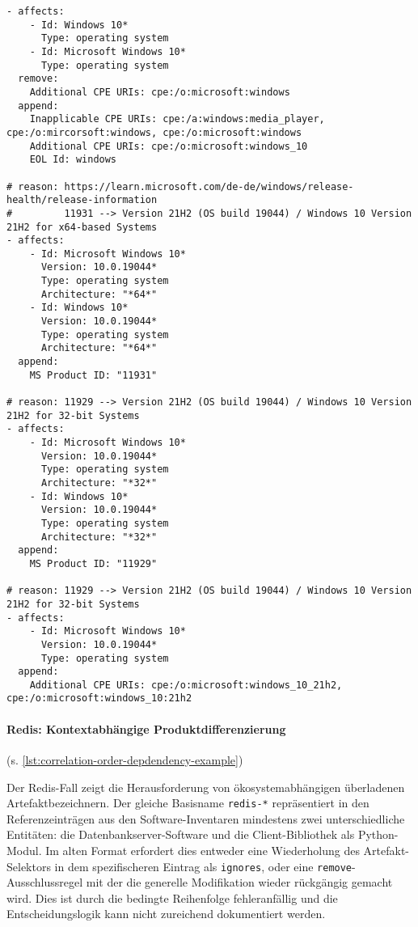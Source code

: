 \begin{lstlisting}[style=yaml,caption={Windows-Korrelation mit mehreren Identifikatoren},label={lst:reference-case-windows},basicstyle=\ttfamily\scriptsize]
- affects:
    - Id: Windows 10*
      Type: operating system
    - Id: Microsoft Windows 10*
      Type: operating system
  remove:
    Additional CPE URIs: cpe:/o:microsoft:windows
  append:
    Inapplicable CPE URIs: cpe:/a:windows:media_player, cpe:/o:mircorsoft:windows, cpe:/o:microsoft:windows
    Additional CPE URIs: cpe:/o:microsoft:windows_10
    EOL Id: windows

# reason: https://learn.microsoft.com/de-de/windows/release-health/release-information
#         11931 --> Version 21H2 (OS build 19044) / Windows 10 Version 21H2 for x64-based Systems
- affects:
    - Id: Microsoft Windows 10*
      Version: 10.0.19044*
      Type: operating system
      Architecture: "*64*"
    - Id: Windows 10*
      Version: 10.0.19044*
      Type: operating system
      Architecture: "*64*"
  append:
    MS Product ID: "11931"

# reason: 11929 --> Version 21H2 (OS build 19044) / Windows 10 Version 21H2 for 32-bit Systems
- affects:
    - Id: Microsoft Windows 10*
      Version: 10.0.19044*
      Type: operating system
      Architecture: "*32*"
    - Id: Windows 10*
      Version: 10.0.19044*
      Type: operating system
      Architecture: "*32*"
  append:
    MS Product ID: "11929"

# reason: 11929 --> Version 21H2 (OS build 19044) / Windows 10 Version 21H2 for 32-bit Systems
- affects:
    - Id: Microsoft Windows 10*
      Version: 10.0.19044*
      Type: operating system
  append:
    Additional CPE URIs: cpe:/o:microsoft:windows_10_21h2, cpe:/o:microsoft:windows_10:21h2
\end{lstlisting}

\paragraph{Redis: Kontextabhängige Produktdifferenzierung}\label{par:reference-case-redis} (s. \autoref{lst:correlation-order-depdendency-example})

Der Redis-Fall zeigt die Herausforderung von ökosystemabhängigen überladenen Artefaktbezeichnern.
Der gleiche Basisname \texttt{redis-*} repräsentiert in den Referenzeinträgen aus den Software-Inventaren mindestens zwei unterschiedliche Entitäten: die Datenbankserver-Software und die Client-Bibliothek als Python-Modul.
Im alten Format erfordert dies entweder eine Wiederholung des Artefakt-Selektors in dem spezifischeren Eintrag als \texttt{ignores}, oder eine \texttt{remove}-Ausschlussregel mit der die generelle Modifikation wieder rückgängig gemacht wird.
Dies ist durch die bedingte Reihenfolge fehleranfällig und die Entscheidungslogik kann nicht zureichend dokumentiert werden.

